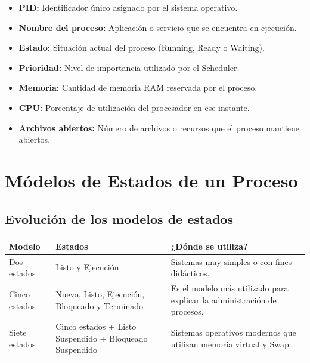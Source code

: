 \documentclass[
  spanish,
  letterpaper,
]{scrbook}
\newcounter{none} %
\providecommand{\tightlist}{%
  \setlength{\itemsep}{0pt}\setlength{\parskip}{0pt}}
\begin{document}
\begin{itemize}
\tightlist
\item
  \textbf{PID:} Identificador único asignado por el sistema operativo.
\item
  \textbf{Nombre del proceso:} Aplicación o servicio que se encuentra en
  ejecución.
\item
  \textbf{Estado:} Situación actual del proceso (Running, Ready o
  Waiting).
\item
  \textbf{Prioridad:} Nivel de importancia utilizado por el Scheduler.
\item
  \textbf{Memoria:} Cantidad de memoria RAM reservada por el proceso.
\item
  \textbf{CPU:} Porcentaje de utilización del procesador en ese
  instante.
\item
  \textbf{Archivos abiertos:} Número de archivos o recursos que el
  proceso mantiene abiertos.
\end{itemize}


\chapter{Módelos de Estados de un
Proceso}\label{muxf3delos-de-estados-de-un-proceso}

\section{Evolución de los modelos de
estados}\label{evoluciuxf3n-de-los-modelos-de-estados}

{\def\LTcaptype{none} %
\begin{longtable}[]{@{}
  >{\raggedright\arraybackslash}p{}
  >{\raggedright\arraybackslash}p{}
  >{\raggedright\arraybackslash}p{}@{}}
\toprule\noalign{}
\begin{minipage}[b]{\linewidth}\raggedright
Modelo
\end{minipage} & \begin{minipage}[b]{\linewidth}\raggedright
Estados
\end{minipage} & \begin{minipage}[b]{\linewidth}\raggedright
¿Dónde se utiliza?
\end{minipage} \\
\midrule\noalign{}
\endhead
\bottomrule\noalign{}
\endlastfoot
Dos estados & Listo y Ejecución & Sistemas muy simples o con fines
didácticos. \\
Cinco estados & Nuevo, Listo, Ejecución, Bloqueado y Terminado & Es el
modelo más utilizado para explicar la administración de procesos. \\
Siete estados & Cinco estados + Listo Suspendido + Bloqueado Suspendido
& Sistemas operativos modernos que utilizan memoria virtual y Swap. \\
\end{longtable}
}
\end{document}
